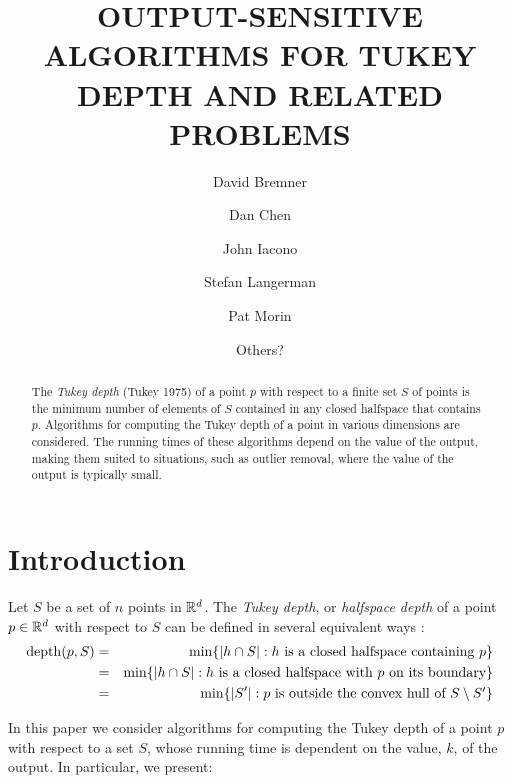 \documentclass[charterfonts,lotsofwhite]{patmorin}
\title{\MakeUppercase{Output-Sensitive Algorithms for Tukey Depth and
        Related Problems}}
\author{David Bremner \and
        Dan Chen \and
	John Iacono \and
	Stefan Langerman \and
	Pat Morin \and
	Others?}
\date{}
\DeclareMathOperator{\td}{depth}
\begin{document}
\maketitle

\begin{abstract}
The \emph{Tukey depth} (Tukey 1975) of a point $p$ with respect to a
finite set $S$ of points is the minimum number of elements of $S$
contained in any closed halfspace that contains $p$.  Algorithms for
computing the Tukey depth of a point in various dimensions are
considered.  The running times of these algorithms depend on the value
of the output, making them suited to situations, such as outlier
removal, where the value of the output is typically small.
\end{abstract}

\section{Introduction}

Let $S$ be a set of $n$ points in $\mathbb{R}^d$.
The \emph{Tukey depth}, or \emph{halfspace depth} of a point $p\in\mathbb{R}^d$ with
respect to $S$ can be defined in several equivalent ways \cite{t75}:
\begin{eqnarray}
\td(p,S) & = & \min\{ |h\cap S| :
	             \mbox{$h$ is a closed halfspace containing $p$} \} \\ 
                     \eqlabel{tuk-orig}
            & = & \min\{ |h\cap S| :
                      \mbox{$h$ is a closed halfspace with $p$ on its boundary} \} \\ 
                       \eqlabel{tuk-boundary}
            & = & \min\{ |S'| :
                      \mbox{$p$ is outside the convex hull of 
                           $S\setminus S'$} \}
                      \eqlabel{tuk-hull}
\end{eqnarray}

In this paper we consider algorithms for computing the Tukey depth of
a point $p$ with respect to a set $S$, whose running time is dependent
on the value, $k$, of the output. In particular, we present:
\end{document}

